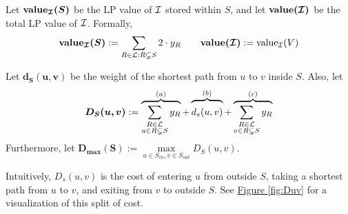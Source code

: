 	\begin{definition}\label{def:value}
		Let $\bm{\textbf{\textup{value}}_{\mathcal{I}}(S)}$ be the LP value of $\mathcal{I}$ stored within $S$, and let $\bm{\textbf{\textup{value}}(\mathcal{I})}$ be the total LP value of $\mathcal{I}$. Formally,
		\[
			\bm{\textbf{\textup{value}}_{\mathcal{I}}(S)}:=\sum\limits_{R\in \mathcal{L}:R\subsetneq S}2\cdot y_R\qquad \bm{\textbf{\textup{value}}(\mathcal{I})}:=\textup{value}_{\mathcal{I}}(V)
		\]
	\end{definition}

	\begin{definition}
		Let $\bm{d_S(u,v)}$ be the weight of the shortest path from $u$ to $v$ inside $S$. Also, let
		\begin{equation}
			\bm{D_S(u,v)}:=\overbrace{\sum_{\substack{R\in \lam \\ u\in R\subsetneq S}}y_R}^{(a)} + \overbrace{\rule{0pt}{4mm}d_s(u,v)}^{(b)} + \overbrace{\sum_{\substack{R\in \lam \\ v\in R\subsetneq S}}y_R}^{(c)}\label{def:1}
		\end{equation}
		Furthermore, let $\bm{D_{\max}(S)} := \max\limits_{u \in S_{in}, v \in S_{out}}D_S(u,v)$.

		Intuitively, $D_s(u,v)$ is the cost of entering $u$ from outside $S$, taking a shortest path from $u$ to $v$, and exiting from $v$ to outside $S$. See \hyperref[fig:Duv]{Figure \ref{fig:Duv}} for a visualization of this split of cost.\\
	\end{definition}
	

